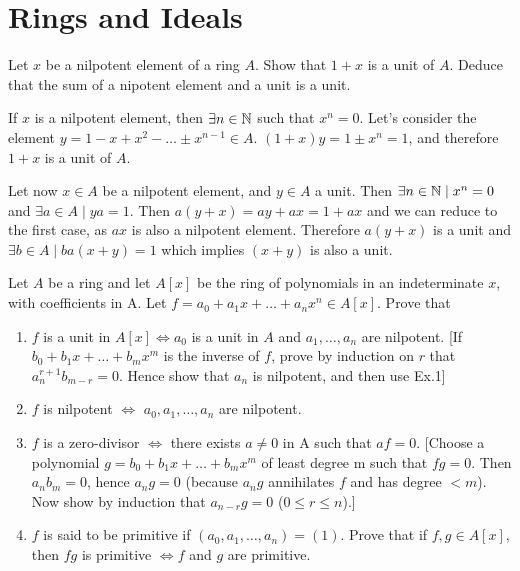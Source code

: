 \section{Rings and Ideals}

\begin{ex}
Let $x$ be a nilpotent element of a ring $A$. Show that $1+x$ is a unit of $A$. Deduce that the sum of a nipotent element and a unit is a unit.
\end{ex}

\begin{sol}
	If $x$ is a nilpotent element, then $\exists n \in \mathbb{N}$ such that $x^n = 0$. Let's consider the element $y = 1 - x + x^2 - \dots \pm x^{n-1} \in A$. $(1+x)y = 1 \pm x^n = 1$, and therefore $1+x$ is a unit of $A$.

	Let now $x \in A$ be a nilpotent element, and $y \in A$ a unit. Then $\exists n \in \mathbb{N} \mid x^n = 0$ and $\exists a \in A \mid ya = 1$. Then $a(y+x) = ay+ax = 1+ax$ and we can reduce to the first case, as $ax$ is also a nilpotent element. Therefore $a(y+x)$ is a unit and $\exists b \in A \mid ba(x+y) = 1$ which implies $(x+y)$ is also a unit. 
\end{sol}

\begin{ex}
Let $A$ be a ring and let $A[x]$ be the ring of polynomials in an indeterminate $x$, with coefficients in A. Let $f = a_0 + a_1 x + \dots + a_nx^n \in A[x]$. Prove that
\begin{enumerate}[label=(\roman*)]
		\item $f$ is a unit in $A[x] \iff a_0$ is a unit in $A$ and $a_1, \dots , a_n$ are nilpotent. [If $b_0 + b_1 x + \dots + b_mx^m$ is the inverse of $f$, prove by induction on $r$ that $a_n^{r+1}b_{m-r} = 0$. Hence show that $a_n$ is nilpotent, and then use Ex.1]
		\item $f$ is nilpotent $\iff$ $a_0 , a_1 , \dots , a_n$ are nilpotent.
		\item $f$ is a zero-divisor $\iff$ there exists $a \neq 0$ in A such that $af = 0$. [Choose a polynomial $g = b_0 + b_1 x + \dots + b_m x^m$ of least degree m such that $fg = 0$. Then $a_nb_m = 0$, hence $a_ng = 0$ (because $a_n g$ annihilates $f$ and has degree $< m$). Now show by induction that $a_{n-r} g = 0$ ($0 \leq r \leq n$).]
		\item $f$ is said to be primitive if $(a_0, a_1 , \dots , a_n) = (1)$. Prove that if $f,g \in A[x]$, then $fg$ is primitive $\iff f$ and $g$ are primitive.
\end{enumerate}
\end{ex}

